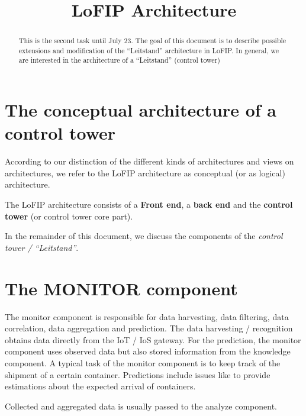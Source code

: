 \documentclass{llncs} %
\begin{document}
\title{LoFIP Architecture}
 

\maketitle

\begin{abstract}
This is the second  task until July 23.
The goal of this document is to describe possible extensions and modification of the
``Leitstand'' architecture in LoFIP.
In general, we are interested in the architecture of a ``Leitstand'' (control tower)

\end{abstract}

\section{The conceptual architecture of a control tower}

According to our distinction of the different kinds of architectures and views on architectures,
we refer to the LoFIP architecture as conceptual (or as logical) architecture.

The LoFIP architecture consists of a \textbf{Front end}, a \textbf{back end} and 
the \textbf{control tower} (or control tower core part).

In the remainder of this document, we discuss the components of the \emph{control tower / ``Leitstand''}.

\section{The MONITOR component}

The monitor component is responsible for data harvesting, data filtering, data correlation, data aggregation
and prediction. 
The data harvesting / recognition obtains data directly from the IoT / IoS gateway. 
For the prediction, the monitor component uses observed data but also stored information from the
knowledge component.
A typical task of the monitor component is to keep track of the shipment of a certain container.
Predictions include issues like to provide estimations about the expected arrival of containers.

Collected and aggregated data is usually passed to the analyze component.
\end{document}
